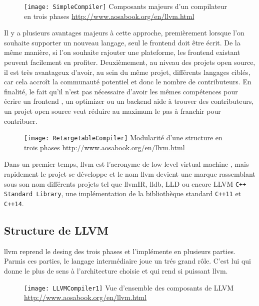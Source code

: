 \begin{figure}[H]
	\centering
	\texttt{[image: SimpleCompiler]}
	{Composants majeurs d'un compilateur en trois phases}
	{\url{http://www.aosabook.org/en/llvm.html}}
	\label{fig:SimpleCompiler}
\end{figure}

Il y a plusieurs avantages majeurs à cette approche, premièrement lorsque l'on souhaite supporter un nouveau langage, seul le \og frontend \fg doit être écrit. De la même manière, si l'on souhaite rajouter une plateforme, les \og frontend \fg existant peuvent facilement en profiter. Deuxièmement, au niveau des projets open source, il est très avantageux d'avoir, au sein du même projet, différents langages ciblés, car cela accroît la communauté potentiel et donc le nombre de contributeurs. En finalité, le fait qu'il n'est pas nécessaire d'avoir les mêmes compétences pour écrire un \og frontend \fg, un \og optimizer \fg ou un \og backend \fg aide à trouver des contributeurs, un projet open source veut réduire au maximum le pas à franchir pour contribuer.

\begin{figure}[H]
	\centering
	\texttt{[image: RetargetableCompiler]}
	{Modularité d'une structure en trois phases}
	{\url{http://www.aosabook.org/en/llvm.html}}
	\label{fig:RetargetableCompiler}
\end{figure}

Dans un premier temps, \gls{llvm} est l'acronyme de \og low level virtual machine \fg, mais rapidement le projet se développe et le nom \gls{llvm} devient une marque rassemblant sous son nom différents projets tel que \gls{llvmIR}, \gls{lldb}, LLD ou encore LLVM \texttt{C++ Standard Library}, une implémentation de la bibliothèque standard \texttt{C++11} et \texttt{C++14}.

\subsection{Structure de LLVM}

\gls{llvm} reprend le desing des trois phases et l'implémente en plusieurs parties. Parmis ces parties, le langage intermédiaire joue un trés grand rôle. C'est lui qui donne le plus de sens à l'architecture choisie et qui rend si puissant \gls{llvm}.

\begin{figure}[H]
	\centering
	\texttt{[image: LLVMCompiler1]}
	{Vue d'ensemble des composants de LLVM}
	{\url{http://www.aosabook.org/en/llvm.html}}
	\label{fig:LLVMCompiler1}
\end{figure}

